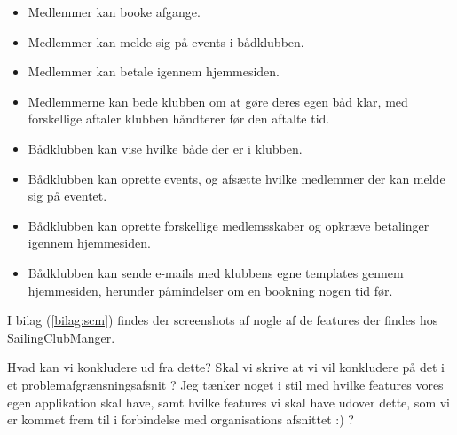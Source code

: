 \begin{itemize}
	\item Medlemmer kan booke afgange.
	\item Medlemmer kan melde sig på events i bådklubben.
	\item Medlemmer kan betale igennem hjemmesiden.
	\item Medlemmerne kan bede klubben om at gøre deres egen båd klar, med forskellige aftaler klubben håndterer
        før den aftalte tid.
	\item Bådklubben kan vise hvilke både der er i klubben.
	\item Bådklubben kan oprette events, og afsætte hvilke medlemmer der kan melde sig på eventet.
	\item Bådklubben kan oprette forskellige medlemsskaber og opkræve betalinger igennem hjemmesiden.
	\item Bådklubben kan sende e-mails med klubbens egne templates gennem hjemmesiden, herunder påmindelser om en
        bookning nogen tid før.
\end{itemize}

I bilag  (\ref{bilag:scm}) findes der screenshots af nogle af de features der findes hos SailingClubManger.

\begin{anfxnote}{Hvad kan vi konkludere ud fra dette?}
  Skal vi skrive at vi vil konkludere på det i et problemafgrænsningsafsnit ? Jeg tænker noget i stil med
  hvilke features vores egen applikation skal have, samt hvilke features vi skal have udover dette, som vi er
  kommet frem til i forbindelse med organisations afsnittet :) ?
\end{anfxnote}

\cbend
